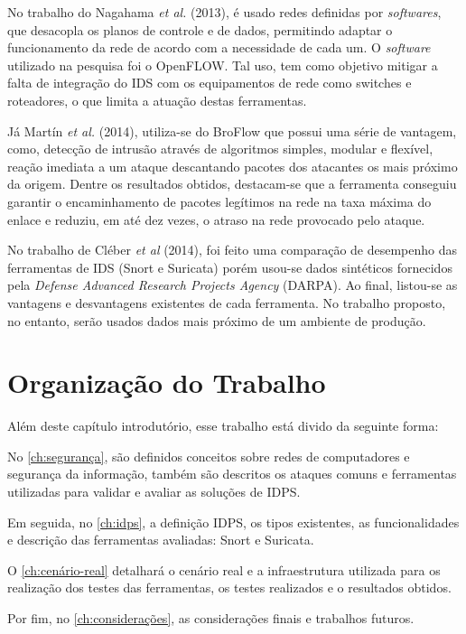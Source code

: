 No trabalho do Nagahama \textit{et al.} (2013), é usado redes definidas por \textit{softwares}, que desacopla os planos de controle e de dados, permitindo adaptar o funcionamento da rede de acordo com a necessidade de cada um. O \textit{software} utilizado na pesquisa foi o OpenFLOW. Tal uso, tem como objetivo mitigar a falta de integração do IDS com os equipamentos de rede como {switches} e roteadores, o que limita a atuação destas ferramentas. 

Já Martín \textit{et al.} (2014), utiliza-se do BroFlow que possui uma série de vantagem, como, detecção de intrusão através de algoritmos simples, modular e flexível, reação imediata a um ataque descantando pacotes dos atacantes os mais próximo da origem. Dentre os resultados obtidos, destacam-se que a ferramenta conseguiu garantir o encaminhamento de pacotes legítimos na rede na taxa máxima do enlace e reduziu, em até dez vezes, o atraso na rede provocado pelo ataque.

No trabalho de Cléber \textit{et al} (2014), foi feito uma comparação de desempenho das ferramentas de IDS (Snort e Suricata) porém usou-se dados sintéticos fornecidos pela \textit{Defense Advanced Research Projects Agency} (DARPA). Ao final, listou-se as vantagens e desvantagens existentes de cada ferramenta. No trabalho proposto, no entanto, serão usados dados mais próximo de um ambiente de produção.

\section{Organização do Trabalho} \label{sec:organização-do-trabalho}

Além deste capítulo introdutório, esse trabalho está divido da seguinte forma:

No \autoref{ch:segurança}, são definidos conceitos sobre redes de computadores e segurança da informação, também são descritos os ataques comuns e ferramentas utilizadas para validar e avaliar as soluções de IDPS.

Em seguida, no \autoref{ch:idps}, a definição IDPS, os tipos existentes, as funcionalidades e descrição das ferramentas avaliadas: Snort e Suricata.

O \autoref{ch:cenário-real} detalhará o cenário real e a infraestrutura utilizada para os realização dos testes das ferramentas, os testes realizados e o resultados obtidos.

Por fim, no \autoref{ch:considerações}, as considerações finais e trabalhos futuros.
